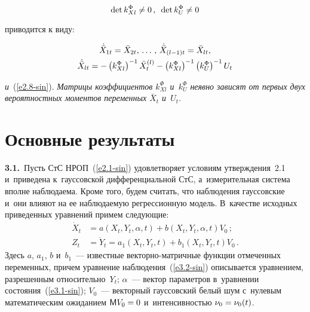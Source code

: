 \begin{multicols}{2}
\vspace*{2pt}

\noindent
   $$
    \det k_{Xl}^\Phi \ne 0\,, \enskip \det k_U^\Phi \ne 0
    $$
    
    \vspace*{-2pt}
    
    \noindent
    приводится к виду:
    
    \noindent
    \begin{gather*}
    \dot{\bar X}_{1t} =\bar X_{2t},\,\ldots\,,\, \dot{\bar X}_{(l-1)t} = \bar X_{lt},\\
    \dot{\bar X}_{lt} =-\left(k_{Xl}^\Phi\right)^{-1} \bar X_t^{(l)} - 
    \left(k_{Xl}^\Phi\right)^{-1} \left(k_U^\Phi\right)^{-1}     U_t
    \end{gather*}
    
    \vspace*{-2pt}
    
    \noindent
\textit{и}~(\ref{e2.8-sin}). 
\textit{Матрицы коэффициентов $k_{Xl}^\Phi$ и~$k_U^\Phi$ неявно зависят от первых 
двух вероятностных моментов переменных $\bar X_t$  и~$U_t$}.



\section{Основные результаты}

\textbf{3.1.}\ Пусть СтС НРОП~(\ref{e2.1-sin}) удовлетворяет условиям утверждения~2.1 
и~приведена к~гауссовской дифференциальной СтС, а~измерительная сис\-те\-ма вполне 
наблюдаема. Кроме того, будем считать, что наблюдения гауссовские и~они влияют 
на ее наблюдаемую регрессионную модель. В~качестве исходных приведенных уравнений примем сле\-ду\-ющие:
   \begin{align}
   \dot X_t &= a \left(X_t, Y_t,\alpha, t\right) + b\left(X_t, Y_t, \alpha, t\right) V_0\,;\label{e3.1-sin}\\
    Z_t&= \dot Y_t= a_1 \left(X_t,Y_t,t\right) + b_1 \left(X_t, Y_t,t\right) V_0\,.\label{e3.2-sin}
    \end{align}
Здесь $a$, $a_1$, $b$ и~$b_1$~--- известные век\-тор\-но-мат\-рич\-ные 
функции отмеченных переменных, причем уравнение наблюдения~(\ref{e3.2-sin}) 
описывается уравнением, разрешенным относительно~$Y_t$; $\alpha$~--- 
вектор па\-ра\-мет\-ров в~уравнении со\-сто\-яния~(\ref{e3.1-sin}); 
$V_0$~--- векторный гауссовский белый шум с~нулевым математическим ожиданием  $\mathsf{M} V_0 \hm=0$ 
и~интенсивностью $\nu_0 \hm= \nu_0(t)$.


\end{multicols}

